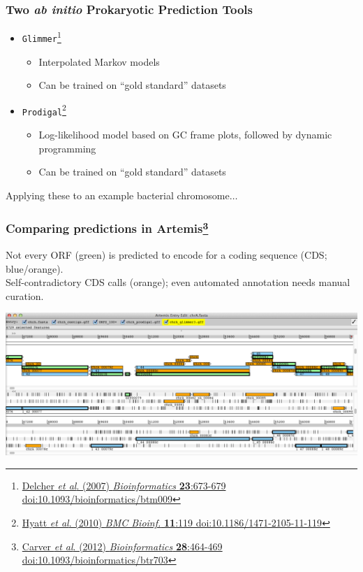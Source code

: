 \begin{frame}
  \frametitle{Two \textit{ab initio} Prokaryotic Prediction Tools}
  \begin{itemize}
    \item \texttt{Glimmer}\footnote{\tiny{\href{http://dx.doi.org/10.1093/bioinformatics/btm009}{Delcher \textit{et al}. (2007) \textit{Bioinformatics} \textbf{23}:673-679 doi:10.1093/bioinformatics/btm009}}}
    \begin{itemize}
      \item Interpolated Markov models
      \item Can be trained on ``gold standard'' datasets
    \end{itemize}
    \item \texttt{Prodigal}\footnote{\tiny{\href{http://dx.doi.org/10.1186/1471-2105-11-119}{Hyatt \textit{et al}. (2010) \textit{BMC Bioinf.} \textbf{11}:119 doi:10.1186/1471-2105-11-119}}}
    \begin{itemize}
      \item Log-likelihood model based on GC frame plots, followed by dynamic programming
      \item Can be trained on ``gold standard'' datasets
    \end{itemize}
  \end{itemize}
  Applying these to an example bacterial chromosome$\ldots$
\end{frame}

\begin{frame}
  \frametitle{Comparing predictions in Artemis\footnote{\tiny{\href{http://dx.doi.org/10.1093/bioinformatics/btr703}{Carver \textit{et al}. (2012) \textit{Bioinformatics} \textbf{28}:464-469 doi:10.1093/bioinformatics/btr703}}}}
  Not every ORF (green) is predicted to encode for a coding sequence (CDS; blue/orange).\\
  Self-contradictory CDS calls (orange); even automated annotation needs manual curation.
  \begin{center}
    \includegraphics[width=1\textwidth]{images/artemis_cdspred3}     
  \end{center}
\end{frame}

